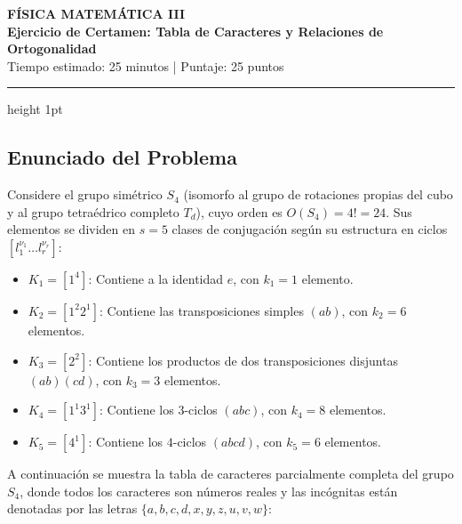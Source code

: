 \documentclass[11pt, a4paper]{article}
\begin{document}
\begin{center}
    {\Large \textbf{\textcolor{primary}{FÍSICA MATEMÁTICA III}}}\\[4pt]
    {\large \textbf{Ejercicio de Certamen: Tabla de Caracteres y Relaciones de Ortogonalidad}}\\[6pt]
    {\small \textcolor{secondary}{Tiempo estimado: 25 minutos \quad | \quad Puntaje: 25 puntos}}
\end{center}
\vspace{2mm}
\hrule height 1pt
\vspace{4mm}

\subsection*{\textcolor{primary}{Enunciado del Problema}}
Considere el grupo simétrico $S_4$ (isomorfo al grupo de rotaciones propias del cubo y al grupo tetraédrico completo $T_d$), cuyo orden es $O(S_4) = 4! = 24$. Sus elementos se dividen en $s = 5$ clases de conjugación según su estructura en ciclos $[l_1^{\nu_1} \dots l_r^{\nu_r}]$:
\begin{itemize}
    \item $K_1 = [1^4]$: Contiene a la identidad $e$, con $k_1 = 1$ elemento.
    \item $K_2 = [1^2 2^1]$: Contiene las transposiciones simples $(ab)$, con $k_2 = 6$ elementos.
    \item $K_3 = [2^2]$: Contiene los productos de dos transposiciones disjuntas $(ab)(cd)$, con $k_3 = 3$ elementos.
    \item $K_4 = [1^1 3^1]$: Contiene los $3$-ciclos $(abc)$, con $k_4 = 8$ elementos.
    \item $K_5 = [4^1]$: Contiene los $4$-ciclos $(abcd)$, con $k_5 = 6$ elementos.
\end{itemize}

A continuación se muestra la tabla de caracteres parcialmente completa del grupo $S_4$, donde todos los caracteres son números reales y las incógnitas están denotadas por las letras $\{a, b, c, d, x, y, z, u, v, w\}$:
\end{document}
